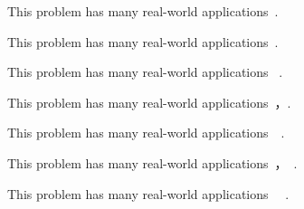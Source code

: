 This problem has many real-world applications~\cite{A}\cite{B}.

This problem has many real-world applications~\cite{A, B}.

This problem has many real-world applications~\cite{A} \cite{B}.

This problem has many real-world applications~\cite{A}，\cite{B}.

This problem has many real-world applications~\cite{A}~\cite{B}.

This problem has many real-world applications~\cite{A}，~\cite{B}.

This problem has many real-world applications~\cite{A} ~\cite{B}.
